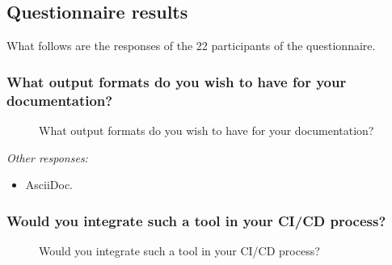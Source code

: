 \subsection{Questionnaire results}

What follows are the responses of the 22 participants of the questionnaire.

\subsubsection*{What output formats do you wish to have for your documentation?}

\begin{figure}[H]
    \centering
    \caption{What output formats do you wish to have for your documentation?}
    \label{fig:qOutputFormats}
\end{figure}

\textit{Other responses:}
\begin{itemize}
    \item AsciiDoc.
\end{itemize}

\subsubsection*{Would you integrate such a tool in your CI/CD process?}

\begin{figure}[H]
    \centering
    \caption{Would you integrate such a tool in your CI/CD process?}
\end{figure}

